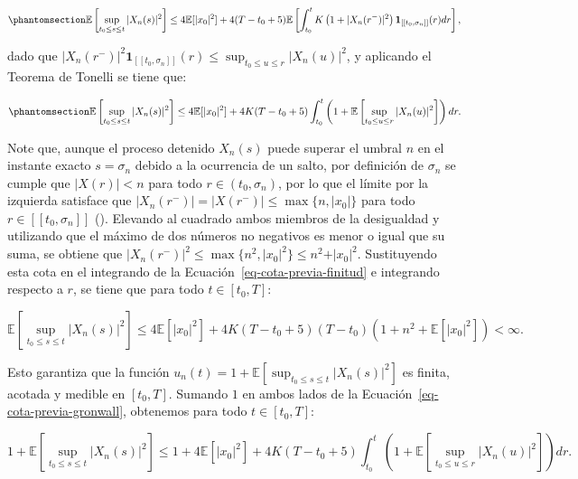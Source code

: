 \documentclass[
  spanish,
  letterpaper,
  DIV=11,
  numbers=noendperiod]{scrreprt}
\theoremstyle{plain}
\theoremstyle{plain}
\theoremstyle{plain}
\theoremstyle{definition}
\theoremstyle{remark}
\begin{document}
\begin{equation}\phantomsection\label{eq-cota-previa-finitud}{
\mathbb{E}\left[ \sup_{t_0 \le s \le t} \vert X_n(s) \vert^2 \right] \le 4\mathbb{E}[\vert x_0 \vert^2] + 4(T - t_0 + 5)\mathbb{E}\left[ \int_{t_0}^t K\left( 1 + \vert X_n(r^-) \vert^2 \right) \mathbf{1}_{[[t_0, \sigma_n]]}(r) dr \right],
}\end{equation}

dado que
\(\displaystyle \vert X_n(r^-) \vert^2 \mathbf{1}_{[[t_0, \sigma_n]]}(r) \le \sup_{t_0 \le u \le r} \vert X_n(u) \vert^2\),
y aplicando el Teorema de Tonelli se tiene que:

\begin{equation}\phantomsection\label{eq-cota-previa-gronwall}{
\mathbb{E}\left[ \sup_{t_0 \le s \le t} \vert X_n(s) \vert^2 \right] \le 4\mathbb{E}[\vert x_0 \vert^2] + 4K(T - t_0 + 5) \int_{t_0}^t \left( 1 + \mathbb{E}\left[ \sup_{t_0 \le u \le r} \vert X_n(u) \vert^2 \right] \right) dr.
}\end{equation}

Note que, aunque el proceso detenido \(X_n(s)\) puede superar el umbral
\(n\) en el instante exacto \(s = \sigma_n\) debido a la ocurrencia de
un salto, por definición de \(\sigma_n\) se cumple que
\(\vert X(r) \vert < n\) para todo \(r \in (t_0, \sigma_n)\), por lo que
el límite por la izquierda satisface que
\(\vert X_n(r^-) \vert = \vert X(r^-) \vert \le \max\{n, \vert x_0 \vert\}\)
para todo \(r \in [[t_0, \sigma_n]]\)
(). Elevando al cuadrado ambos
miembros de la desigualdad y utilizando que el máximo de dos números no
negativos es menor o igual que su suma, se obtiene que
\(\vert X_n(r^-) \vert^2 \le \max\{n^2, \vert x_0 \vert^2\} \le n^2 + \vert x_0 \vert^2\).
Sustituyendo esta cota en el integrando de la
Ecuación~\ref{eq-cota-previa-finitud} e integrando respecto a \(r\), se
tiene que para todo \(t \in [t_0, T]\):

\[
\mathbb{E}\left[ \sup_{t_0 \le s \le t} \vert X_n(s) \vert^2 \right] \le 4\mathbb{E}[\vert x_0 \vert^2] + 4K(T - t_0 + 5)(T - t_0)\left( 1 + n^2 + \mathbb{E}[\vert x_0 \vert^2] \right) < \infty.
\]

Esto garantiza que la función
\(\displaystyle u_n(t) = 1 + \mathbb{E}\left[ \sup_{t_0 \le s \le t} \vert X_n(s) \vert^2 \right]\)
es finita, acotada y medible en \([t_0, T].\) Sumando \(1\) en ambos
lados de la Ecuación~\ref{eq-cota-previa-gronwall}, obtenemos para todo
\(t \in [t_0, T]\):

\[
1 + \mathbb{E}\left[ \sup_{t_0 \le s \le t} \vert X_n(s) \vert^2 \right] \le 1 + 4\mathbb{E}[\vert x_0 \vert^2] + 4K(T - t_0 + 5) \int_{t_0}^t \left( 1 + \mathbb{E}\left[ \sup_{t_0 \le u \le r} \vert X_n(u) \vert^2 \right] \right) dr.
\]
\end{document}
